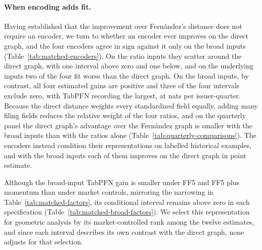 \paragraph{When encoding adds fit.}
Having established that the improvement over Fern\'andez's distance does
not require an encoder, we turn to whether an encoder ever improves on the
direct graph, and the four encoders agree in sign against it only on the
broad inputs (Table~\ref{tab:matched-encoders}). On the ratio inputs they
scatter around the direct graph, with one interval above zero and one
below, and on the underlying inputs two of the four fit worse than the
direct graph. On the broad inputs, by contrast, all four estimated gains
are positive and three of the four intervals exclude zero, with TabPFN
recording the
largest, at  nats per issuer-quarter. Because the
direct distance weights every standardized field equally, adding many
filing fields reduces the relative weight of the four ratios, and on the
quarterly panel the direct graph's advantage over the Fern\'andez graph is
smaller with the broad inputs than with the ratios alone
(Table~\ref{tab:quarterly-comparisons}). The encoders instead
condition their representations on labelled historical examples, and with
the broad inputs each of them improves on the direct graph in point
estimate.

Although the broad-input TabPFN gain is smaller under FF5 and FF5 plus
momentum than under market controls, mirroring the narrowing in
Table~\ref{tab:matched-factors}, its conditional interval remains above
zero in each specification (Table~\ref{tab:matched-broad-factors}). We
select this representation for geometric analysis by its market-controlled
rank among the twelve estimates, and since each interval describes its own
contrast with the direct graph, none adjusts for that selection.

